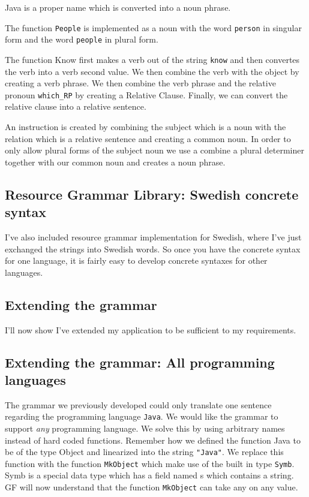 \documentclass[
10pt, %
a4paper, %
oneside, %
headinclude,footinclude, %
BCOR5mm, %
]{scrartcl}
\begin{document}
Java is a proper name which is converted into a noun phrase. 

The function \texttt{People} is implemented as a noun with the word \texttt{person} in singular form and the word \texttt{people} in plural form.

The function Know first makes a verb out of the string \texttt{know} and then convertes the verb into a verb second value. We then combine the verb with the object by creating a verb phrase. We then combine the verb phrase and the relative pronoun \texttt{which\_RP} by creating a Relative Clause. Finally, we can convert the relative clause into a relative sentence.

An instruction is created by combining the subject which is a noun with the relation which is a relative sentence and creating a common noun. In order to only allow plural forms of the subject noun we use a combine a plural determiner together with our common noun and creates a noun phrase.

\subsection{Resource Grammar Library: Swedish concrete syntax}
I've also included resource grammar implementation for Swedish, where I've just exchanged the strings into Swedish words. So once you have the concrete syntax for one language, it is fairly easy to develop concrete syntaxes for other languages.

\subsection{Extending the grammar}
I'll now show I've extended my application to be sufficient to my requirements.

\subsection{Extending the grammar: All programming languages}
The grammar we previously developed could only translate one sentence regarding the programming language \texttt{Java}. We would like the grammar to support \emph{any} programming language. 
\newline
\newline
We solve this by using arbitrary names instead of hard coded functions.
\newline
\newline
Remember how we defined the function Java to be of the type Object and linearized into the string \texttt{"Java"}.
\newline
\newline
We replace this function with the function \texttt{MkObject} which make use of the built in type \texttt{Symb}. Symb is a special data type which has a field named s which contains a string. GF will now understand that the function \texttt{MkObject} can take any on any value.
\end{document}
